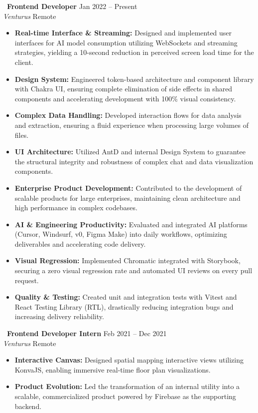\documentclass[10pt,a4paper]{article}
\begin{document}
\noindent\textbf{\textbullet~Frontend Developer} \hfill Jan 2022 -- Present \\
\textit{Venturus} \hfill Remote
\begin{itemize}[leftmargin=*,label=\textendash,itemsep=2pt,parsep=0pt,topsep=2pt]
  \item \textbf{Real-time Interface \& Streaming:} Designed and implemented user interfaces for AI model consumption utilizing WebSockets and streaming strategies, yielding a 10-second reduction in perceived screen load time for the client.
  \item \textbf{Design System:} Engineered token-based architecture and component library with Chakra UI, ensuring complete elimination of side effects in shared components and accelerating development with 100\% visual consistency.
  \item \textbf{Complex Data Handling:} Developed interaction flows for data analysis and extraction, ensuring a fluid experience when processing large volumes of files.
  \item \textbf{UI Architecture:} Utilized AntD and internal Design System to guarantee the structural integrity and robustness of complex chat and data visualization components.
  \item \textbf{Enterprise Product Development:} Contributed to the development of scalable products for large enterprises, maintaining clean architecture and high performance in complex codebases.
  \item \textbf{AI \& Engineering Productivity:} Evaluated and integrated AI platforms (Cursor, Windsurf, v0, Figma Make) into daily workflows, optimizing deliverables and accelerating code delivery.
  \item \textbf{Visual Regression:} Implemented Chromatic integrated with Storybook, securing a zero visual regression rate and automated UI reviews on every pull request.
  \item \textbf{Quality \& Testing:} Created unit and integration tests with Vitest and React Testing Library (RTL), drastically reducing integration bugs and increasing delivery reliability.
\end{itemize}

\vspace{4pt}

\noindent\textbf{\textbullet~Frontend Developer Intern} \hfill Feb 2021 -- Dec 2021 \\
\textit{Venturus} \hfill Remote
\begin{itemize}[leftmargin=*,label=\textendash,itemsep=2pt,parsep=0pt,topsep=2pt]
  \item \textbf{Interactive Canvas:} Designed spatial mapping interactive views utilizing KonvaJS, enabling immersive real-time floor plan visualizations.
  \item \textbf{Product Evolution:} Led the transformation of an internal utility into a scalable, commercialized product powered by Firebase as the supporting backend.
\end{itemize}
\end{document}
